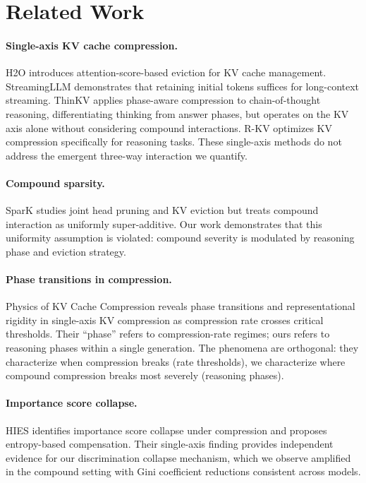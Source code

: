\documentclass[11pt]{article}
\begin{document}
\section{Related Work}

\paragraph{Single-axis KV cache compression.}
H2O \citep{zhang2023h2o} introduces attention-score-based eviction for KV cache management. StreamingLLM \citep{xiao2024streamingllm} demonstrates that retaining initial tokens suffices for long-context streaming. ThinKV \citep{xu2025thinkv} applies phase-aware compression to chain-of-thought reasoning, differentiating thinking from answer phases, but operates on the KV axis alone without considering compound interactions. R-KV \citep{rkv2025} optimizes KV compression specifically for reasoning tasks. These single-axis methods do not address the emergent three-way interaction we quantify.

\paragraph{Compound sparsity.}
SparK \citep{spark2024} studies joint head pruning and KV eviction but treats compound interaction as uniformly super-additive. Our work demonstrates that this uniformity assumption is violated: compound severity is modulated by reasoning phase and eviction strategy.

\paragraph{Phase transitions in compression.}
Physics of KV Cache Compression \citep{physics_kv2026} reveals phase transitions and representational rigidity in single-axis KV compression as compression rate crosses critical thresholds. Their ``phase'' refers to compression-rate regimes; ours refers to reasoning phases within a single generation. The phenomena are orthogonal: they characterize when compression breaks (rate thresholds), we characterize where compound compression breaks most severely (reasoning phases).

\paragraph{Importance score collapse.}
HIES \citep{hies2025} identifies importance score collapse under compression and proposes entropy-based compensation. Their single-axis finding provides independent evidence for our discrimination collapse mechanism, which we observe amplified in the compound setting with Gini coefficient reductions consistent across models.
\end{document}
